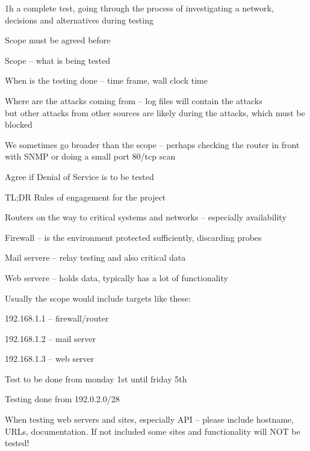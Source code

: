 \documentclass[Screen16to9,17pt]{foils}
\begin{document}
\begin{list1}
\item 1h a complete test, going through the process of investigating a network, decisions and alternatives during testing
\end{list1}




\begin{list1}
\item Scope must be agreed before
\begin{list2}
\item Scope -- what is being tested
\item When is the testing done -- time frame, wall clock time
\item Where are the attacks coming from -- log files will contain the attacks\\
but other attacks from other sources are likely during the attacks, which must be blocked
\item We sometimes go broader than the scope -- perhaps checking the router in front with SNMP or doing a small port 80/tcp scan
\item Agree if Denial of Service is to be tested
\item TL;DR Rules of engagement for the project
\end{list2}
\end{list1}



\begin{list2}
\item Routers on the way to critical systems and networks -- especially availability
\item Firewall -- is the environment protected sufficiently, discarding probes
\item Mail servere -- relay testing and also critical data
\item Web servere -- holds data, typically has a lot of functionality
\end{list2}



\begin{list1}
\item Usually the scope would include targets like these:
\begin{list2}
\item 192.168.1.1 -- firewall/router
\item 192.168.1.2 -- mail server
\item 192.168.1.3 -- web server
\item Test to be done from monday 1st until friday 5th
\item Testing done from 192.0.2.0/28
\end{list2}
\item When testing web servers and sites, especially API -- please include hostname, URLs, documentation. If not included some sites and functionality will NOT be tested!
\end{list1}
\end{document}
